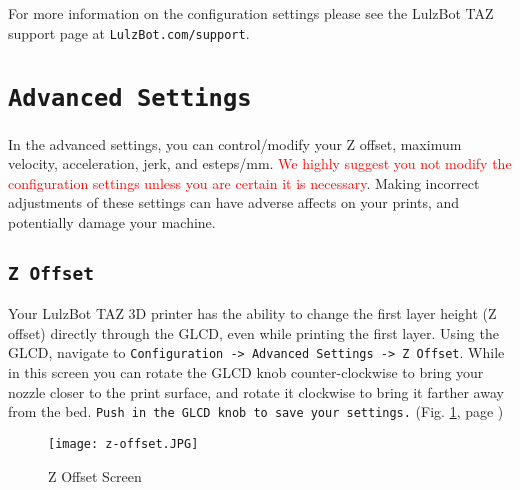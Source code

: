 For more information on the configuration settings please see the LulzBot TAZ support page at \texttt{LulzBot.com/support}.

\section{\texttt{Advanced Settings}}
In the advanced settings, you can control/modify your Z offset, maximum velocity, acceleration, jerk, and esteps/mm. \textcolor{red}{We highly suggest you not modify the configuration settings unless you are certain it is necessary}. Making incorrect adjustments of these settings can have adverse affects on your prints, and potentially damage your machine.

\subsection{\texttt{Z Offset}} 
\label{sssec:Z Offset}
Your LulzBot TAZ 3D printer has the ability to change the first layer height (Z offset) directly through the GLCD, even while printing the first layer. Using the GLCD, navigate to \texttt{Configuration -> Advanced Settings -> Z Offset}. While in this screen you can rotate the GLCD knob counter-clockwise to bring your nozzle closer to the print surface, and rotate it clockwise to bring it farther away from the bed. \texttt{Push in the GLCD knob to save your settings.} (Fig. \ref{fig:Z_offset_screen}, page \pageref{fig:Z_offset_screen})

\begin{figure}[H]
\centering
\texttt{[image: z-offset.JPG]}
\caption{Z Offset Screen}
\label{fig:Z_offset_screen}
\end{figure}



